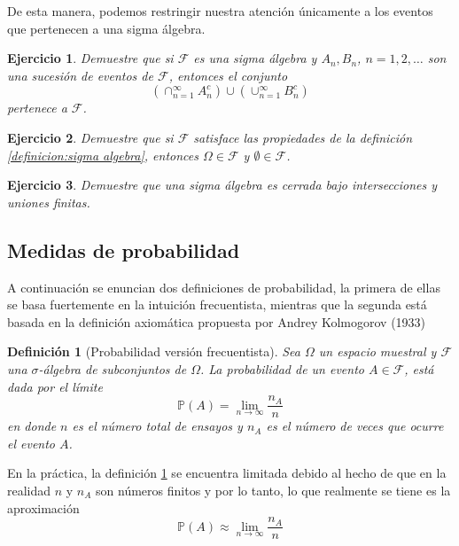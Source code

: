 \documentclass[11pt]{report}
\theoremstyle{break}
\newtheorem{definicion}{Definición}[chapter]
\newtheorem{ejercicio}{Ejercicio}[chapter]
\theoremstyle{break}
\begin{document}
De esta manera, podemos restringir nuestra atención únicamente a los eventos que pertenecen a una sigma álgebra.

\begin{ejercicio}
Demuestre que si $\mathcal{F}$ es una sigma álgebra y $A_n, B_n$, $n=1,2,\ldots$ son una sucesión de eventos de $\mathcal{F}$, entonces el conjunto
$$
\left(\cap_{n = 1}^{\infty} A_{n}^{c}  \right) \cup \left(\cup_{n = 1}^{\infty} B_{n}^{c}  \right)
$$
pertenece a $\mathcal{F}$.
\end{ejercicio}

\begin{ejercicio}
Demuestre que si $\mathcal{F}$ satisface las propiedades de la definición \ref{definicion:sigma algebra}, entonces $\Omega \in \mathcal{F}$ y $\emptyset \in \mathcal{F}$.
\end{ejercicio}

\begin{ejercicio}
Demuestre que una sigma álgebra es cerrada bajo intersecciones y uniones finitas.
\end{ejercicio}

\subsection{Medidas de probabilidad}
A continuación se enuncian dos definiciones de  probabilidad, la primera de ellas se basa fuertemente en la intuición frecuentista, mientras que la segunda está basada en la definición axiomática propuesta por Andrey Kolmogorov (1933)

\begin{definicion}[Probabilidad versión frecuentista]
\label{definicion:probabilidad frecuentista}
Sea $\Omega$ un espacio muestral y $\mathcal{F}$ una $\sigma$-álgebra de subconjuntos de $\Omega$. La probabilidad de un evento $A \in \mathcal{F}$, está dada por el límite
$$
\mathbb{P}(A) = \lim_{n \rightarrow \infty} \dfrac{n_A}{n}
$$
en donde $n$ es el número total de ensayos y $n_A$ es el número de veces que ocurre el evento $A$.
\end{definicion}
En la práctica, la definición \ref{definicion:probabilidad frecuentista} se encuentra limitada debido al hecho de que en la realidad $n$ y $n_A$ son números finitos y por lo tanto, lo que realmente se tiene es la aproximación
$$
\mathbb{P}(A) \approx \lim_{n \rightarrow \infty} \dfrac{n_A}{n}
$$
\end{document}
